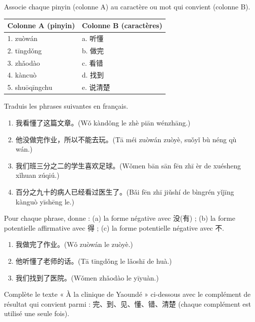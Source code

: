 \documentclass[11pt]{article}
\newcounter{popsec}
\newcounter{popsub}
\newcommand{\courssub}[1]{%
  \stepcounter{popsub}%
  \par\vspace{9pt}\noindent{\popxbold\fontsize{11.5}{13}\selectfont\color{popink}{\color{poporange}\thepopsec.\thepopsub}\hspace{6pt}#1}\par\nopagebreak\vspace{4pt}
}
\begin{document}
\begin{exercice}
Associe chaque pinyin (colonne A) au caractère ou mot qui convient (colonne B).
\begin{center}
\begin{tabularx}{\linewidth}{|X|X|}\hline
\rowcolor{popblueL} Colonne A (pinyin) & Colonne B (caractères) \\ \hline
1. zuòwán & a. 听懂 \\ \hline
2. tīngdǒng & b. 做完 \\ \hline
3. zhǎodào & c. 看错 \\ \hline
4. kàncuò & d. 找到 \\ \hline
5. shuōqīngchu & e. 说清楚 \\ \hline
\end{tabularx}
\end{center}
\end{exercice}

\courssub{Je m'entraîne}

\begin{exercice}
Traduis les phrases suivantes en français.
\begin{enumerate}
\item 我看懂了这篇文章。(Wǒ kàndǒng le zhè piān wénzhāng.)
\item 他没做完作业，所以不能去玩。(Tā méi zuòwán zuòyè, suǒyǐ bù néng qù wán.)
\item 我们班三分之二的学生喜欢足球。(Wǒmen bān sān fēn zhī èr de xuésheng xǐhuan zúqiú.)
\item 百分之九十的病人已经看过医生了。(Bǎi fēn zhī jiǔshí de bìngrén yǐjīng kànguò yīshēng le.)
\end{enumerate}
\end{exercice}

\begin{exercice}
Pour chaque phrase, donne : (a) la forme négative avec 没(有) ; (b) la forme potentielle affirmative avec 得 ; (c) la forme potentielle négative avec 不.
\begin{enumerate}
\item 我做完了作业。(Wǒ zuòwán le zuòyè.)
\item 他听懂了老师的话。(Tā tīngdǒng le lǎoshī de huà.)
\item 我们找到了医院。(Wǒmen zhǎodào le yīyuàn.)
\end{enumerate}
\end{exercice}

\begin{exercice}
Complète le texte « À la clinique de Yaoundé » ci-dessous avec le complément de résultat qui convient parmi : 完、到、见、懂、错、清楚 (chaque complément est utilisé une seule fois).
\end{exercice}
\end{document}
